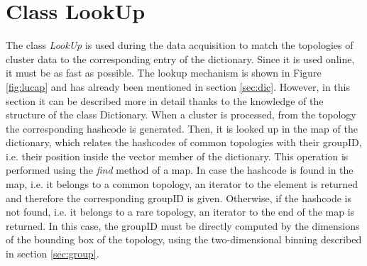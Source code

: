 \section{Class LookUp}
The class \textit{LookUp} is used during the data acquisition to match the topologies of cluster data to the corresponding entry of the dictionary. Since it is used online, it must be as fast as possible. The lookup mechanism is shown in Figure \ref{fig:lucap} and has already been mentioned in section \ref{sec:dic}. However, in this section it can be described more in detail thanks to the knowledge of the structure of the class Dictionary. When a cluster is processed, from the topology the corresponding hashcode is generated. Then, it is looked up in the map of the dictionary, which relates the hashcodes of common topologies with their groupID, i.e. their position inside the vector member of the dictionary. This operation is performed using the \textit{find} method of a map. In case the hashcode is found in the map, i.e. it belongs to a common topology, an iterator to the element is returned and therefore the corresponding groupID is given. Otherwise, if the hashcode is not found, i.e. it belongs to a rare topology, an iterator to the end of the map is returned. In this case, the groupID must be directly computed by the dimensions of the bounding box of the topology, using the two-dimensional binning described in section \ref{sec:group}.
